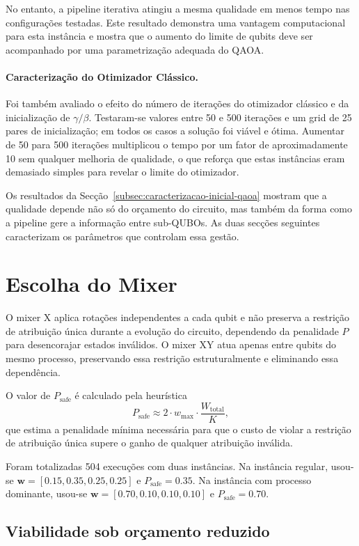 No entanto, a pipeline iterativa atingiu a mesma qualidade em menos tempo nas configurações
testadas. Este resultado demonstra uma vantagem computacional para esta instância e mostra que o
aumento do limite de qubits deve ser acompanhado por uma parametrização adequada do QAOA.

\paragraph{Caracterização do Otimizador Clássico.}
Foi também avaliado o efeito do número de iterações do otimizador clássico e da 
inicialização de $\gamma/\beta$. Testaram-se valores entre 50 e 500 iterações e um 
grid de 25 pares de inicialização; em todos os casos a solução foi viável e ótima. 
Aumentar de 50 para 500 iterações multiplicou o tempo por um fator de aproximadamente 
10 sem qualquer melhoria de qualidade, o que reforça que estas instâncias eram 
demasiado simples para revelar o limite do otimizador.

\clearpage
Os resultados da Secção~\ref{subsec:caracterizacao-inicial-qaoa} mostram que a
qualidade depende não só do orçamento do circuito, mas também da forma como a pipeline
gere a informação entre sub-QUBOs. As duas secções seguintes caracterizam os parâmetros
que controlam essa gestão.

\section{Escolha do Mixer}

O mixer X aplica rotações independentes a cada qubit e não preserva a restrição 
de atribuição única durante a evolução do circuito, dependendo da penalidade $P$ para 
desencorajar estados inválidos. O mixer XY atua apenas entre qubits do mesmo 
processo, preservando essa restrição estruturalmente e eliminando essa dependência.

O valor de $P_\text{safe}$ é calculado pela heurística
\[
P_\text{safe} \approx 2 \cdot w_{\max} \cdot \frac{W_\text{total}}{K},
\]
que estima a penalidade mínima necessária para que o custo de violar a restrição 
de atribuição única supere o ganho de qualquer atribuição inválida.

Foram totalizadas 504 execuções com duas instâncias. Na instância regular,
usou-se $\mathbf{w}=[0.15, 0.35, 0.25, 0.25]$ e $P_\text{safe}=0.35$.
Na instância com processo dominante, usou-se
$\mathbf{w}=[0.70, 0.10, 0.10, 0.10]$ e $P_\text{safe}=0.70$.

\subsection{Viabilidade sob orçamento reduzido}

